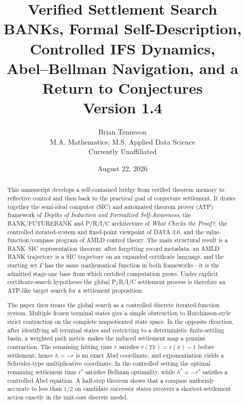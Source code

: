\documentclass[11pt]{article}
\title{\Huge\textbf{Verified Settlement Search}\\[0.25em]
\Large BANKs, Formal Self-Description, Controlled IFS Dynamics,\\
Abel--Bellman Navigation, and a Return to Conjectures\\[0.7em]
\large Version 1.4}
\author{Brian Tenneson\\
\small M.A. Mathematics; M.S. Applied Data Science\\
\small Currently Unaffiliated}
\date{August 22, 2026}
\theoremstyle{definition}
\theoremstyle{remark}
\begin{document}
\maketitle

\begin{abstract}
This manuscript develops a self-contained bridge from verified theorem memory to reflective control and then back to the practical goal of conjecture settlement. It draws together the semi-ideal computer (SIC) and automated theorem prover (ATP) framework of \emph{Depths of Induction and Formalized Self-Awareness}, the BANK/FUTUREBANK and P/R/I/C architecture of \emph{What Checks the Proof?}, the controlled iterated-system and fixed-point viewpoint of DATA 3.0, and the value-function/compass program of AMLD control theory. The main structural result is a BANK--SIC representation theorem: after forgetting record metadata, an AMLD BANK trajectory is a SIC trajectory on an expanded certificate language, and the starting set $\Gamma$ has the same mathematical function in both frameworks---it is the admitted stage-one base from which certified computation grows. Under explicit certificate-search hypotheses the global P/R/I/C settlement process is therefore an ATP-like target search for a settlement proposition.

The paper then treats the global search as a controlled discrete iterated-function system. Multiple frozen terminal states give a simple obstruction to Hutchinson-style strict contraction on the complete unquotiented state space. In the opposite direction, after identifying all terminal states and restricting to a deterministic finite-settling basin, a weighted path metric makes the induced settlement map a genuine contraction. The remaining hitting time $r$ satisfies $r(Tx)=r(x)-1$ before settlement; hence $h=-r$ is an exact Abel coordinate, and exponentiation yields a Schr\"oder-type multiplicative coordinate. In the controlled setting the optimal remaining settlement time $r^*$ satisfies Bellman optimality, while $h^*=-r^*$ satisfies a controlled Abel equation. A half-step theorem shows that a compass uniformly accurate to less than $1/2$ on candidate successor states recovers a shortest-settlement action exactly in the unit-cost discrete model.


\end{abstract}
\end{document}
